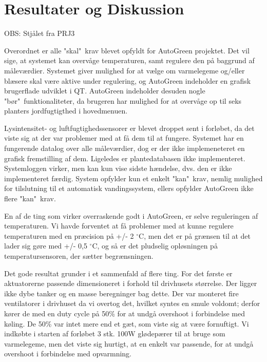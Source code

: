 \section{Resultater og Diskussion} \label{ch:Resultater_og_diskussion}

OBS: Stjålet fra PRJ3

Overordnet er alle "skal"\ krav blevet opfyldt for AutoGreen projektet. 
Det vil sige, at systemet kan overvåge temperaturen, samt regulere den på baggrund af måleværdier. 
Systemet giver mulighed for at vælge om varmelegeme og/eller blæsere skal være aktive under regulering, og AutoGreen indeholder en grafisk brugerflade udviklet i QT. 
AutoGreen indeholder desuden nogle "bør"\ funktionaliteter, da brugeren har mulighed for at overvåge op til seks planters jordfugtigthed i hovedmenuen. 

Lysintensitet- og luftfugtighedssensorer er blevet droppet sent i forløbet, da det viste sig at der var problemer med at få dem til at fungere. 
Systemet har en fungerende datalog over alle måleværdier, dog er der ikke implemeneteret en grafisk fremstilling af dem. 
Ligeledes er plantedatabasen ikke implementeret.
Systemloggen virker, men kan kun vise sidste hændelse, dvs. den er ikke implementeret færdig.
System opfylder kun et enkelt "kan"\ krav, nemlig mulighed for tilslutning til et automatisk vandingssystem, ellers opfylder AutoGreen ikke flere "kan"\ krav. 

\mbox{}

En af de ting som virker overraskende godt i AutoGreen, er selve reguleringen af temperaturen. 
Vi havde forventet at få problemer med at kunne regulere temperaturen med en præcision på +/- 2 $^{\circ}$C, men det er på grænsen til at det lader sig gøre med +/- 0,5 $^{\circ}$C, og så er det pludselig opløsningen på temperatursensoren, der sætter begrænsningen. 

Det gode resultat grunder i et sammenfald af flere ting. 
For det første er aktuatorerne passende dimensioneret i forhold til drivhusets størrelse. 
Der ligger ikke dybe tanker og en masse beregninger bag dette. 
Der var monteret fire ventilatorer i drivhuset da vi overtog det, hvilket syntes en smule voldomt; derfor kører de med en duty cycle på 50\% for at undgå overshoot i forbindelse med køling.
De 50\% var intet mere end et gæt, som viste sig at være fornuftigt.
Vi indkøbte i starten af forløbet 3 stk. 100W glødepærer til at bruge som varmelegeme, men det viste sig hurtigt, at en enkelt var passende, for at undgå overshoot i forbindelse med opvarmning.  

